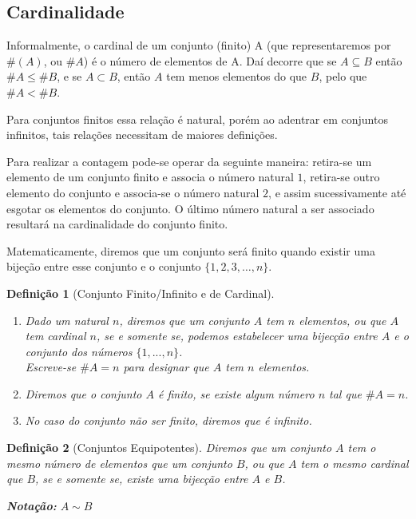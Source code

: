 \documentclass[oneside,a4paper,12pt]{article}
\newtheorem{definition}{Definição}[section]
\begin{document}
\subsection{Cardinalidade}

Informalmente, o cardinal de um conjunto (finito) A (que representaremos por $\#(A)$, ou $\#A$) é o número de elementos de A. Daí decorre que se $A \subseteq B$ então $\#A \leq \#B$, e se $A \subset B$, então $A$ tem menos elementos do que $B$, pelo que $\#A < \#B$.

Para conjuntos finitos essa relação é natural, porém ao adentrar em conjuntos infinitos, tais relações necessitam de maiores definições.

Para realizar a contagem pode-se operar da seguinte maneira: retira-se um elemento de um conjunto finito e associa o número natural $1$, retira-se outro elemento do conjunto e associa-se o número natural $2$, e assim sucessivamente até esgotar os elementos do conjunto. O último número natural a ser associado resultará na cardinalidade do conjunto finito.

Matematicamente, diremos que um conjunto será finito quando existir uma bijeção entre esse conjunto e o conjunto $\{1, 2, 3, \dots, n\}$.

\begin{definition}[Conjunto Finito/Infinito e de Cardinal]
	
	\begin{enumerate}
		\item Dado um natural $n$, diremos que um conjunto $A$ tem $n$ elementos, ou que $A$ tem cardinal $n$, se e somente se, podemos estabelecer uma bijecção entre $A$ e o conjunto dos números $\{1, ..., n\}$. \\
		Escreve-se $\#A = n$ para designar que $A$ tem $n$ elementos.
		\item Diremos que o conjunto $A$ é {\it finito}, se existe algum número $n$ tal que $\#A = n$.
		\item No caso do conjunto não ser finito, diremos que é {\it infinito}. 
	\end{enumerate}

\end{definition}


\begin{definition}[Conjuntos Equipotentes]
	Diremos que um conjunto $A$ tem o mesmo número de elementos que um conjunto $B$, ou que $A$ tem o mesmo cardinal que $B$, se e somente se, existe uma bijecção entre $A$ e $B$.
	
	{\bf Notação: } $A \sim B$	
\end{definition}
\end{document}
